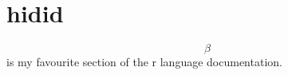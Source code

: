 \documentclass{article}
\begin{document}

\section{hidid}
$$\beta$$ is my favourite section of the r language documentation.
\end{document}
